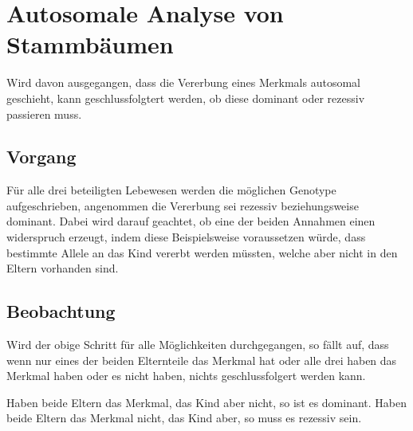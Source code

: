 \documentclass{article}
\begin{document}
\section{Autosomale Analyse von Stammbäumen}
Wird davon ausgegangen, dass die Vererbung eines Merkmals autosomal geschieht, kann geschlussfolgtert werden, ob diese dominant oder rezessiv passieren muss.
 
\subsection{Vorgang}
Für alle drei beteiligten Lebewesen werden die möglichen Genotype aufgeschrieben, angenommen die Vererbung sei rezessiv beziehungsweise dominant. Dabei wird darauf geachtet, ob eine der beiden Annahmen einen widerspruch erzeugt, indem diese Beispielsweise voraussetzen würde, dass bestimmte Allele an das Kind vererbt werden müssten, welche aber nicht in den Eltern vorhanden sind. 
 
\subsection{Beobachtung} 
Wird der obige Schritt für alle Möglichkeiten durchgegangen, so fällt auf, dass wenn nur eines der beiden Elternteile das Merkmal hat oder alle drei haben das Merkmal haben oder es nicht haben, nichts geschlussfolgert werden kann.
 
Haben beide Eltern das Merkmal, das Kind aber nicht, so ist es dominant. Haben beide Eltern das Merkmal nicht, das Kind aber, so muss es rezessiv sein.  
\end{document}
